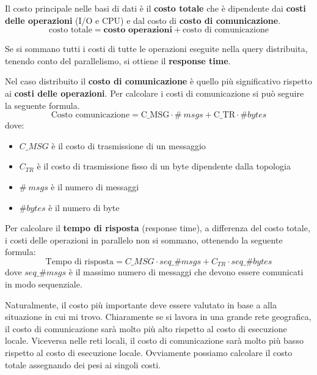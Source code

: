 Il costo principale nelle basi di dati è il \textbf{costo totale} che è dipendente
dai \textbf{costi delle operazioni} (I/O e CPU) e dal costo di \textbf{costo di comunicazione}.
\begin{equation*}
    \text{costo totale} = \textbf{costo operazioni} + \text{costo di comunicazione}
\end{equation*}

Se si sommano tutti i costi di tutte le operazioni eseguite nella query distribuita,
tenendo conto del parallelismo, si ottiene il \textbf{response time}.

Nel caso distribuito il \textbf{costo di comunicazione} è quello più significativo rispetto
ai \textbf{costi delle operazioni}. Per calcolare i costi di comunicazione si
può seguire la seguente formula.
\begin{equation*}
    \text{Costo comunicazione} = \text{C\_{MSG}} \cdot \#\ msgs  + \text{C\_{TR}} \cdot \#bytes
\end{equation*}
dove:
\begin{itemize}
    \item \textbf{$C\_{MSG}$} è il costo di trasmissione di un messaggio
    \item \textbf{$C_{TR}$} è il costo di trasmissione fisso di un byte dipendente dalla topologia
    \item \textbf{$\#\ msgs$} è il numero di messaggi
    \item \textbf{$\#bytes$} è il numero di byte
\end{itemize}

Per calcolare il \textbf{tempo di risposta} (response time), a differenza del
costo totale, i costi delle operazioni in parallelo non si sommano,
ottenendo la seguente formula:
\begin{equation*}
    \text{Tempo di risposta} = C\_{MSG} \cdot seq\_\#msgs + C_{TR} \cdot seq\_\#bytes
\end{equation*}
dove $seq\_\#msgs$ è il massimo numero di messaggi che devono essere comunicati
in modo sequenziale.

Naturalmente, il costo più importante deve essere valutato in base a alla
situazione in cui mi trovo. Chiaramente se si lavora in una grande rete
geografica, il costo di comunicazione sarà molto più alto rispetto al costo di
esecuzione locale. Viceversa nelle reti locali, il costo di comunicazione sarà
molto più basso rispetto al costo di esecuzione locale. Ovviamente possiamo calcolare
il costo totale assegnando dei pesi ai singoli costi.

